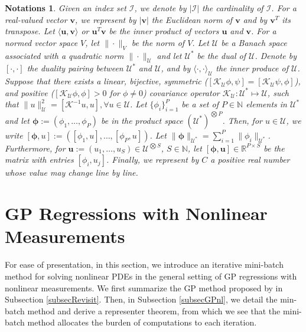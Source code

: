 \documentclass[10pt,reqno]{amsart}
\newcommand{\1}{{\chi}}
\numberwithin{equation}{section}
\theoremstyle{thmlemcorr}
\numberwithin{theorem}{section}
\theoremstyle{thmlemcorr*}
\theoremstyle{defi}
\theoremstyle{remexample}
\theoremstyle{ass}
\newtheorem*{notations*}{Notations}
\begin{document}
\begin{notations*}
Given an index set $\mathcal{I}$, we denote by $|\mathcal{I}|$  the cardinality of $\mathcal{I}$.  For a real-valued vector $\boldsymbol{v}$, we represent by $|\boldsymbol{v}|$ the Euclidean norm of $\boldsymbol{v}$ and by $\boldsymbol{v}^T$ its transpose. Let $\langle \boldsymbol{u}, \boldsymbol{v}\rangle$ or $\boldsymbol{u}^T\boldsymbol{v}$ be the inner product of vectors $\boldsymbol{u}$ and $\boldsymbol{v}$.  For a normed vector space $V$, let $\|\cdot\|_V$ be the norm of $V$. 
	Let $\mathcal{U}$ be a Banach space associated with a quadratic norm $\|\cdot\|_{\mathcal{U}}$ and let $\mathcal{U}^*$ be the dual of $\mathcal{U}$. Denote by $[\cdot, \cdot]$ the duality pairing between $\mathcal{U}^*$ and $\mathcal{U}$, and by $\langle \cdot, \cdot\rangle_{\mathcal{U}}$ the inner produce of $\mathcal{U}$.  Suppose  that there exists a linear, bijective, symmetric ($[\mathcal{K}_{\mathcal{U}}\phi, \psi]=[\mathcal{K}_{\mathcal{U}}\psi, \phi]$), and positive ($[\mathcal{K}_{\mathcal{U}}\phi, \phi]>0$ for $\phi\not=0$) covariance operator $\mathcal{K}_{\mathcal{U}}: \mathcal{U}^*\mapsto \mathcal{U}$, such that 
		$\|u\|_{\mathcal{U}}^2 = [\mathcal{K}^{-1}u, u], \forall u\in \mathcal{U}$. 
	Let $\{\phi_i\}_{i=1}^P$ be a set of $P\in\mathbb{N}$ elements in $\mathcal{U}^*$ and let  $\boldsymbol{\phi}:=(\phi_1, \dots, \phi_P)$ be in the product space ${(\mathcal{U}^*)}^{\bigotimes P}$. Then, for $u\in \mathcal{U}$, we write $[\boldsymbol{\phi}, u]:=([{\phi}_1, u], \dots, [{\phi}_P, u])$.
	Let $\|\boldsymbol{\phi}\|_{\mathcal{U}^*}=\sum_{i=1}^P\|{\phi}_i\|_{\mathcal{U}^*}$. 
	Furthermore, for $\boldsymbol{u}:=(u_1,\dots,u_S)\in \mathcal{U}^{\bigotimes S}$, $S\in \mathbb{N}$,  let $[\boldsymbol{\phi}, \boldsymbol{u}]\in\mathbb{R}^{P\times S}$ be the matrix with entries $[\phi_i, u_j]$. 
	Finally, we represent by $C$ a positive real number whose value  may change line by line. 
\end{notations*}

\section{GP Regressions with Nonlinear Measurements}
\label{secGPNM}
For ease of presentation, in this section, we introduce an iterative mini-batch method for solving nonlinear PDEs in the general setting of GP regressions with nonlinear measurements. We first summarize the GP method proposed by \cite{chen2021solving} in Subsection \ref{subsecRevisit}. Then, in Subsection \ref{subsecGPnl}, we detail the min-batch method and derive a representer theorem, from which we see that the mini-batch method allocates the burden of computations to each iteration. 
\end{document}
